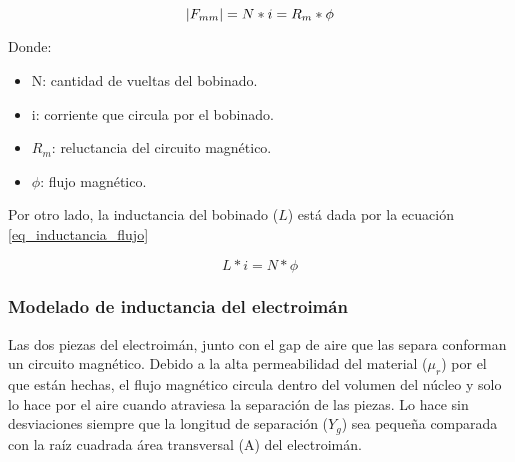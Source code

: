 



\begin{equation} \label{eq_fuerza-magnetomotriz}
	\lvert F_{mm}\rvert=N*i=R_{m}*\phi	
\end{equation}

\noindent Donde: 
\begin{itemize}
	\item N: cantidad de vueltas del bobinado.
	\item i: corriente que circula por el bobinado.
	\item $R_{m}$: reluctancia del circuito magnético.
	\item $\phi$: flujo magnético.
\end{itemize}


\noindent Por otro lado, la inductancia del bobinado ($L$) está dada por la ecuación \ref{eq_inductancia_flujo}

\begin{equation} \label{eq_inductancia_flujo}
	L*i=N*\phi
\end{equation}

\subsubsection{Modelado de inductancia del electroimán}

\noindent Las dos piezas del electroimán, junto con el gap de aire que las separa conforman un circuito magnético. Debido a la alta permeabilidad del material ($\mu_{r}$) por el que están hechas, el flujo magnético circula dentro del volumen del núcleo y solo lo hace por el aire cuando atraviesa la separación de las piezas. Lo hace sin desviaciones siempre que la longitud de separación ($Y_{g}$) sea pequeña comparada con la raíz cuadrada área transversal (A) del electroimán.

